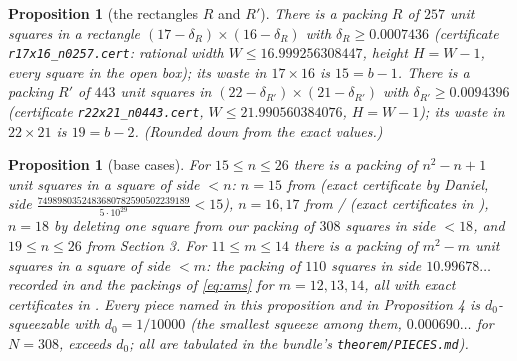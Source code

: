 \documentclass[11pt,letterpaper]{amsart}
\theoremstyle{plain}
\newtheorem{proposition}[theorem]{Proposition}
\begin{document}
\begin{proposition}[the rectangles $R$ and $R'$]
There is a packing $R$ of $257$ unit squares in a rectangle $(17 - \delta_R) \times (16 - \delta_R)$ with $\delta_R \ge 0.0007436$ (certificate \texttt{r17x16\_n0257.cert}: rational width $W \le 16.999256308447$, height $H = W - 1$, every square in the open box); its waste in $17 \times 16$ is $15 = b - 1$. There is a packing $R'$ of $443$ unit squares in $(22 - \delta_{R'}) \times (21 - \delta_{R'})$ with $\delta_{R'} \ge 0.0094396$ (certificate \texttt{r22x21\_n0443.cert}, $W \le 21.990560384076$, $H = W - 1$); its waste in $22 \times 21$ is $19 = b - 2$. (Rounded down from the exact values.)
\end{proposition}

\begin{proposition}[base cases]
\begin{sloppypar}
For $15 \le n \le 26$ there is a packing of $n^2 - n + 1$ unit squares in a square of side $< n$: $n = 15$ from \cite{dW26} (exact certificate by Daniel, side $\frac{7498980352483680782590502239189}{5 \cdot 10^{29}} < 15$), $n = 16, 17$ from \cite{AMS21}/\cite{Ell26} (exact certificates in \cite{Dan26}), $n = 18$ by deleting one square from our packing of $308$ squares in side $< 18$, and $19 \le n \le 26$ from Section 3. For $11 \le m \le 14$ there is a packing of $m^2 - m$ unit squares in a square of side $< m$: the packing of $110$ squares in side $10.99678\ldots$ recorded in \cite{Ell26} and the packings of \eqref{eq:ams} for $m = 12, 13, 14$, all with exact certificates in \cite{Dan26}. Every piece named in this proposition and in Proposition 4 is $d_0$-squeezable with $d_0 = 1/10000$ (the smallest squeeze among them, $0.000690\ldots$ for $N = 308$, exceeds $d_0$; all are tabulated in the bundle's \texttt{theorem/PIECES.md}).
\end{sloppypar}
\end{proposition}
\end{document}
